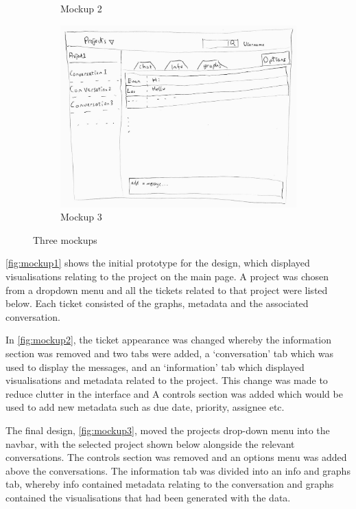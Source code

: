 \documentclass[a4paper]{l3proj}
\begin{document}
\begin{figure}
\begin{subfigure}[b]{0.3\textwidth}
		\caption{Mockup 2}
		\label{fig:mockup2} 
    \end{subfigure}
    \hfill
    \begin{subfigure}[b]{0.3\textwidth}
        \centering
		\includegraphics[width=\textwidth]{mockup3}
		\caption{Mockup 3}
		\label{fig:mockup3} 
    \end{subfigure}
    \caption{Three mockups}
    \label{fig:Three mockups}
\end{figure}

\autoref{fig:mockup1} shows the initial prototype for the design, which displayed visualisations relating to the project on the main page.  A project was chosen from a dropdown menu and all the tickets related to that project were listed below.   Each ticket consisted of the graphs, metadata and the associated conversation.

In \autoref{fig:mockup2}, the ticket appearance was changed whereby the information section was removed and two tabs were added, a ‘conversation’ tab which was used to display the messages, and an ‘information’ tab which displayed visualisations and metadata related to the project. This change was made to reduce clutter in the interface and  A controls section was added which would be used to add new metadata such as due date, priority, assignee etc.

The final design, \autoref{fig:mockup3}, moved the projects drop-down menu into the navbar, with the selected project shown below alongside the relevant conversations.  The controls section was removed and an options menu was added above the conversations.  The information tab was divided into an info and graphs tab, whereby info contained metadata relating to the conversation and graphs contained the visualisations that had been generated with the data.
\end{document}
